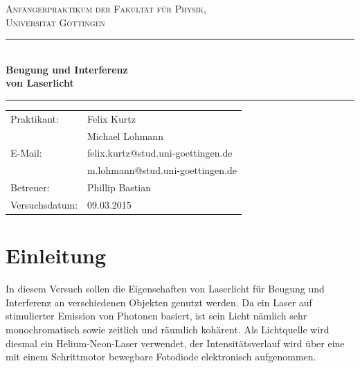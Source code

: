 \documentclass[12pt,a4paper,titlepage,headinclude,bibtotoc]{scrartcl}
\begin{document}
\begin{titlepage}
\centering
\textsc{\Large Anfängerpraktikum der Fakultät für
  Physik,\\[1.5ex] Universität Göttingen}

\vspace*{4.2cm}

\rule{\textwidth}{1pt}\\[0.5cm]
{\huge \bfseries
  Beugung und Interferenz\\[1.5ex]
  von Laserlicht}\\[0.5cm]
\rule{\textwidth}{1pt}

\vspace*{3.0cm}

\begin{Large}
\begin{tabular}{ll}
Praktikant:
 	&  Felix Kurtz\\
 	&  Michael Lohmann\\

E-Mail: 
	&  felix.kurtz@stud.uni-goettingen.de\\
	& m.lohmann@stud.uni-goettingen.de\\

 Betreuer: & Phillip Bastian\\
 Versuchsdatum: &  09.03.2015\\
\end{tabular}
\end{Large}

\vspace*{0.8cm}

\begin{Large}
\end{Large}

\end{titlepage}

\tableofcontents

\newpage

\section{Einleitung}
\label{sec:einleitung}
In diesem Versuch sollen die Eigenschaften von Laserlicht für Beugung und Interferenz an verschiedenen Objekten genutzt werden.
Da ein Laser auf stimulierter Emission von Photonen basiert, ist sein Licht nämlich sehr monochromatisch sowie zeitlich und räumlich kohärent.
Als Lichtquelle wird diesmal ein Helium-Neon-Laser verwendet, der Intensitätsverlauf wird über eine mit einem Schrittmotor bewegbare Fotodiode elektronisch aufgenommen.
\end{document}
